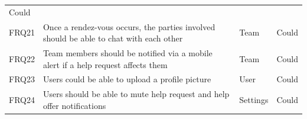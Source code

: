 \begin{longtable}[]{@{}llll@{}}
\begin{minipage}[t]{0.09\columnwidth}
Could\strut
\end{minipage}\tabularnewline
\begin{minipage}[t]{0.04\columnwidth}\raggedright\strut
FRQ21\strut
\end{minipage} & \begin{minipage}[t]{0.64\columnwidth}\raggedright\strut
Once a rendez-vous occurs, the parties involved should be able to chat
with each other\strut
\end{minipage} & \begin{minipage}[t]{0.12\columnwidth}\raggedright\strut
Team\strut
\end{minipage} & \begin{minipage}[t]{0.09\columnwidth}\raggedright\strut
Could\strut
\end{minipage}\tabularnewline
\begin{minipage}[t]{0.04\columnwidth}\raggedright\strut
FRQ22\strut
\end{minipage} & \begin{minipage}[t]{0.64\columnwidth}\raggedright\strut
Team members should be notified via a mobile alert if a help request
affects them\strut
\end{minipage} & \begin{minipage}[t]{0.12\columnwidth}\raggedright\strut
Team\strut
\end{minipage} & \begin{minipage}[t]{0.09\columnwidth}\raggedright\strut
Could\strut
\end{minipage}\tabularnewline
\begin{minipage}[t]{0.04\columnwidth}\raggedright\strut
FRQ23\strut
\end{minipage} & \begin{minipage}[t]{0.64\columnwidth}\raggedright\strut
Users could be able to upload a profile picture\strut
\end{minipage} & \begin{minipage}[t]{0.12\columnwidth}\raggedright\strut
User\strut
\end{minipage} & \begin{minipage}[t]{0.09\columnwidth}\raggedright\strut
Could\strut
\end{minipage}\tabularnewline
\begin{minipage}[t]{0.04\columnwidth}\raggedright\strut
FRQ24\strut
\end{minipage} & \begin{minipage}[t]{0.64\columnwidth}\raggedright\strut
Users should be able to mute help request and help offer
notifications\strut
\end{minipage} & \begin{minipage}[t]{0.12\columnwidth}\raggedright\strut
Settings\strut
\end{minipage} & \begin{minipage}[t]{0.09\columnwidth}\raggedright\strut
Could\strut
\end{minipage}\tabularnewline
\bottomrule
\end{longtable}

